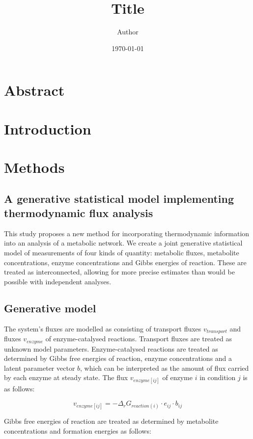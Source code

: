 \documentclass[11pt]{article}
\title{ Title}
\author{ Author }
\date{\today}
\begin{document}
	\maketitle	
	\pagebreak
	

\section{Abstract}

\section{Introduction}

\section{Methods}	
\subsection{A generative statistical model implementing thermodynamic flux analysis}

This study proposes a new method for incorporating thermodynamic information
into an analysis of a metabolic network. We create a joint generative
statistical model of measurements of four kinds of quantity: metabolic fluxes,
metabolite concentrations, enzyme concentrations and Gibbs energies of
reaction. These are treated as interconnected, allowing for more precise
estimates than would be possible with independent analyses.

\subsection{Generative model}

The system's fluxes are modelled as consisting of transport fluxes
$v_{transport}$ and fluxes $v_{enzyme}$ of enzyme-catalysed
reactions. Transport fluxes are treated as unknown model
parameters. Enzyme-catalysed reactions are treated as determined by Gibbs free
energies of reaction, enzyme concentrations and a latent parameter vector $b$,
which can be interpreted as the amount of flux carried by each enzyme at steady
state. The flux $v_{enzyme[ij]}$ of enzyme $i$ in condition $j$ is as follows:

\[
v_{enzyme[ij]} = -\Delta_rG_{reaction(i)} \cdot e_{ij} \cdot b_{ij}
\]

Gibbs free energies of reaction are treated as determined by metabolite
concentrations and formation energies as follows:
\end{document}
